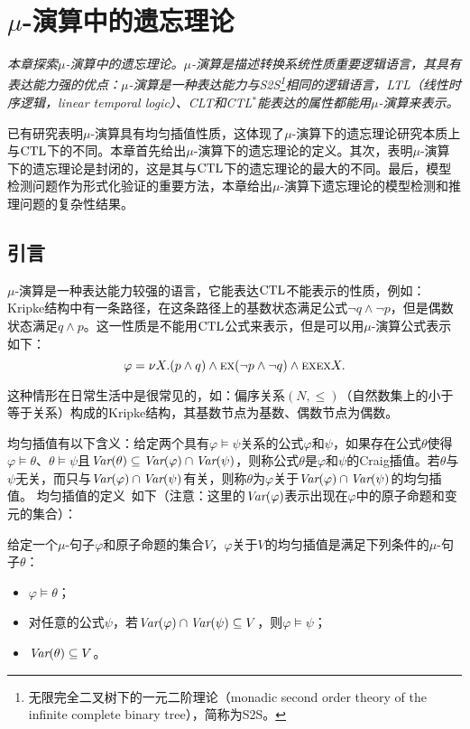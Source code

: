 \chapter{$\mu$-演算中的遗忘理论}\label{chapter06}
{\em 本章探索$\mu$-演算中的遗忘理论。$\mu$-演算是描述转换系统性质重要逻辑语言，其具有表达能力强的优点：$\mu$-演算是一种表达能力与S2S\footnote{无限完全二叉树下的一元二阶理论（monadic second order theory of the infinite complete binary tree），简称为S2S。}相同的逻辑语言，LTL（线性时序逻辑，linear temporal logic）、CLT和CTL$^*$能表达的属性都能用$\mu$-演算来表示。
	
	已有研究表明$\mu$-演算具有均匀插值性质，这体现了$\mu$-演算下的遗忘理论研究本质上与$\textrm{CTL}$下的不同。本章首先给出$\mu$-演算下的遗忘理论的定义。其次，表明$\mu$-演算下的遗忘理论是封闭的，这是其与$\textrm{CTL}$下的遗忘理论的最大的不同。最后，模型检测问题作为形式化验证的重要方法，本章给出$\mu$-演算下遗忘理论的模型检测和推理问题的复杂性结果。
	}

\section{引言}
$\mu$-演算是一种表达能力较强的语言，它能表达$\textrm{CTL}$不能表示的性质，例如：Kripke结构中有一条路径，在这条路径上的基数状态满足公式$\neg q \wedge \neg p$，但是偶数状态满足$q \wedge p$。这一性质是不能用$\textrm{CTL}$公式来表示，但是可以用$\mu$-演算公式表示如下：
$$\varphi = \nu X.(p \wedge q) \wedge \textsc{e} \textsc{x}(\neg p \wedge \neg q) \wedge \textsc{e} \textsc{x} \textsc{e} \textsc{x} X.$$

这种情形在日常生活中是很常见的，如：偏序关系$(N, \leq)$（自然数集上的小于等于关系）构成的Kripke结构，其基数节点为基数、偶数节点为偶数。


均匀插值有以下含义：给定两个具有$\varphi\models\psi$关系的公式$\varphi$和$\psi$，如果存在公式$\theta$使得$\varphi\models \theta$、$\theta \models \psi$且$\textit{Var}(\theta) \subseteq \textit{Var}(\varphi) \cap \textit{Var}(\psi)$，则称公式$\theta$是$\varphi$和$\psi$的Craig插值。若$\theta$与$\psi$无关，而只与$\textit{Var}(\varphi) \cap \textit{Var}(\psi)$有关，则称$\theta$为$\varphi$关于$\textit{Var}(\varphi) \cap \textit{Var}(\psi)$的均匀插值。
均匀插值的定义~\cite{d2006modal}如下（注意：这里的$\textit{Var}(\varphi)$表示出现在$\varphi$中的原子命题和变元的集合）：                                                                                                                                                                                                                                              
\begin{definition}
	给定一个$\mu$-句子$\varphi$和原子命题的集合$V$，$\varphi$关于$V$的均匀插值是满足下列条件的$\mu$-句子$\theta$：
	\begin{itemize}
		\item $\varphi \models \theta$；
		\item 对任意的公式$\psi$，若$\textit{Var}(\varphi) \cap \textit{Var}(\psi)\subseteq V$，则$\varphi \models \psi$；
		\item $\textit{Var}(\theta) \subseteq V$。 
	\end{itemize}
\end{definition}


